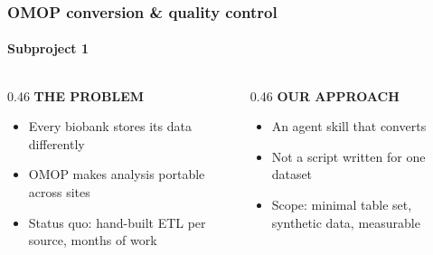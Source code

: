 \documentclass[aspectratio=169,11pt]{beamer}
\newcommand{\colhead}[1]{%
  {\scriptsize\bfseries\color{muted}\MakeUppercase{#1}}\par
  \vspace{0.25em}{\color{rulecol}\rule{\linewidth}{0.8pt}}\par\vspace{0.6em}}
\begin{document}
\begin{frame}
  \frametitle{OMOP conversion \& quality control}
  \framesubtitle{Subproject 1}
  \vspace{1.0em}
  \begin{columns}[t]
    \begin{column}{0.46\textwidth}
      \colhead{The problem}
      \begin{itemize}
        \item Every biobank stores its data differently
        \item OMOP makes analysis portable across sites
        \item Status quo: hand-built ETL per source, months of work
      \end{itemize}
    \end{column}
    \begin{column}{0.46\textwidth}
      \colhead{Our approach}
      \begin{itemize}
        \item An agent skill that converts
        \item Not a script written for one dataset
        \item Scope: minimal table set, synthetic data, measurable
      \end{itemize}
    \end{column}
  \end{columns}
\end{frame}
\end{document}
